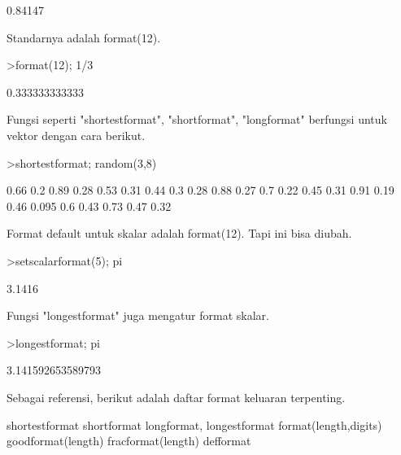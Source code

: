 \documentclass{article}
\begin{document}
\begin{eulernotebook}
\begin{euleroutput}
      0.84147 
\end{euleroutput}
\begin{eulercomment}
Standarnya adalah format(12).
\end{eulercomment}
\begin{eulerprompt}
>format(12); 1/3
\end{eulerprompt}
\begin{euleroutput}
  0.333333333333
\end{euleroutput}
\begin{eulercomment}
Fungsi seperti "shortestformat", "shortformat", "longformat" berfungsi
untuk vektor dengan cara berikut.
\end{eulercomment}
\begin{eulerprompt}
>shortestformat; random(3,8)
\end{eulerprompt}
\begin{euleroutput}
    0.66    0.2   0.89   0.28   0.53   0.31   0.44    0.3 
    0.28   0.88   0.27    0.7   0.22   0.45   0.31   0.91 
    0.19   0.46  0.095    0.6   0.43   0.73   0.47   0.32 
\end{euleroutput}
\begin{eulercomment}
Format default untuk skalar adalah format(12). Tapi ini bisa diubah.
\end{eulercomment}
\begin{eulerprompt}
>setscalarformat(5); pi
\end{eulerprompt}
\begin{euleroutput}
  3.1416
\end{euleroutput}
\begin{eulercomment}
Fungsi "longestformat" juga mengatur format skalar.
\end{eulercomment}
\begin{eulerprompt}
>longestformat; pi
\end{eulerprompt}
\begin{euleroutput}
  3.141592653589793
\end{euleroutput}
\begin{eulercomment}
Sebagai referensi, berikut adalah daftar format keluaran terpenting.

\end{eulercomment}
\begin{eulerttcomment}
 shortestformat shortformat longformat, longestformat
 format(length,digits) goodformat(length)
 fracformat(length)
 defformat
\end{eulerttcomment}
\begin{eulercomment}


\end{eulercomment}
\end{eulernotebook}
\end{document}
